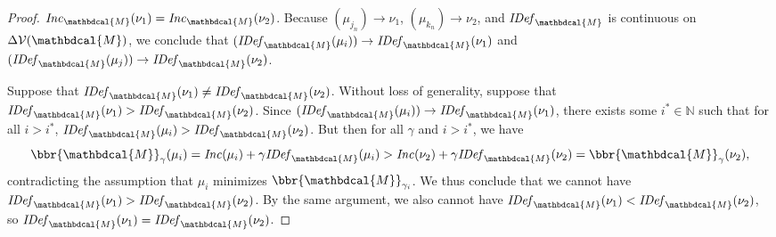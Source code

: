 \documentclass{article}
\theoremstyle{plain}
\theoremstyle{definition}
\theoremstyle{remark}
\newcommand{\V}{\mathcal V}
\newcommand{\dg}[1]{\mathbdcal{#1}}
\newcommand{\IDef}[1]{\mathit{IDef}_{#1}}
\newcommand\Inc{\mathit{Inc}}
\numberwithin{equation}{section}
\begin{document}
\begin{proof}
$\Inc_{\dg M}(\nu_1) = \Inc_{\dg M}(\nu_2)$.  
Because  $(\mu_{j_n}) \to \nu_1$, $(\mu_{k_n}) \to \nu_2$, and
$\IDef{\dg M}$ is
continuous on $\Delta\V(\dg M)$,
we conclude that  
$(\IDef{\dg M}(\mu_{i}))\to \IDef{\dg M}(\nu_1)$ and
$(\IDef{\dg M}(\mu_{j}))\to \IDef{\dg M}(\nu_2)$.

Suppose that $\IDef{\dg
M}(\nu_1) \neq \IDef{\dg M}(\nu_2)$. Without loss of generality,
suppose that $\IDef{\dg M}(\nu_1) > \IDef{\dg M}(\nu_2)$. 
Since $(\IDef{\dg M}(\mu_{i})) \to \IDef{\dg M}(\nu_1)$, there exists some $i^*
\in \mathbb N$ such that for all $i > i^*$,  
$ \IDef{\dg M}(\mu_{i}) >  \IDef{\dg M}(\nu_2) $.
But then for all $\gamma$ and $i > i^*$, we have 
\[ \bbr{\dg M}_\gamma(\mu_i) = \Inc(\mu_i) + \gamma\IDef{\dg M}(\mu_i)
> \Inc(\nu_2)  
+ \gamma \IDef{\dg M}(\nu_2) = \bbr{\dg M}_\gamma(\nu_2),\]
contradicting the assumption that $\mu_{i}$ minimizes
$\bbr{\dg M}_{\gamma_{i}}$. We thus conclude that we
cannot have $\IDef{\dg M}(\nu_1) > \IDef{\dg M}(\nu_2)$.  By the same
argument, we also cannot have $\IDef{\dg M}(\nu_1) < \IDef{\dg
  M}(\nu_2)$, so $\IDef{\dg M}(\nu_1) =\IDef{\dg M}(\nu_2)$.  
  

\end{proof}
\end{document}
